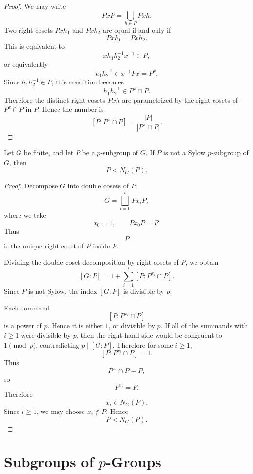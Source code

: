 \begin{proof}
We may write
\[
    PxP=\bigcup_{h\in P}Pxh.
\]
Two right cosets \(Pxh_1\) and \(Pxh_2\) are equal if and only if
\[
    Pxh_1=Pxh_2.
\]
This is equivalent to
\[
    xh_1h_2^{-1}x^{-1}\in P,
\]
or equivalently
\[
    h_1h_2^{-1}\in x^{-1}Px=P^x.
\]
Since \(h_1h_2^{-1}\in P\), this condition becomes
\[
    h_1h_2^{-1}\in P^x\cap P.
\]
Therefore the distinct right cosets \(Pxh\) are parametrized by the right cosets of
\(P^x\cap P\) in \(P\). Hence the number is
\[
    [P:P^x\cap P]
    =
    \frac{|P|}{|P^x\cap P|}.
\]
\end{proof}

\begin{lemma}
Let \(G\) be finite, and let \(P\) be a \(p\)-subgroup of \(G\). If \(P\) is not a Sylow \(p\)-subgroup of \(G\), then
\[
    P<N_G(P).
\]
\end{lemma}

\begin{proof}
Decompose \(G\) into double cosets of \(P\):
\[
    G
    =
    \bigsqcup_{i=0}^{t}Px_iP,
\]
where we take
\[
    x_0=1,
    \qquad
    Px_0P=P.
\]
Thus
\[
    P
\]
is the unique right coset of \(P\) inside \(P\).

Dividing the double coset decomposition by right cosets of \(P\), we obtain
\[
    [G:P]
    =
    1+
    \sum_{i=1}^{t}
    [P:P^{x_i}\cap P].
\]
Since \(P\) is not Sylow, the index \([G:P]\) is divisible by \(p\).

Each summand
\[
    [P:P^{x_i}\cap P]
\]
is a power of \(p\). Hence it is either \(1\), or divisible by \(p\). If all of the summands with \(i\geq 1\) were divisible by \(p\), then the right-hand side would be congruent to \(1\pmod p\), contradicting \(p\mid [G:P]\). Therefore for some \(i\geq 1\),
\[
    [P:P^{x_i}\cap P]=1.
\]
Thus
\[
    P^{x_i}\cap P=P,
\]
so
\[
    P^{x_i}=P.
\]
Therefore
\[
    x_i\in N_G(P).
\]
Since \(i\geq 1\), we may choose \(x_i\notin P\). Hence
\[
    P<N_G(P).
\]
\end{proof}

\section{Subgroups of \texorpdfstring{$p$}{p}-Groups}

